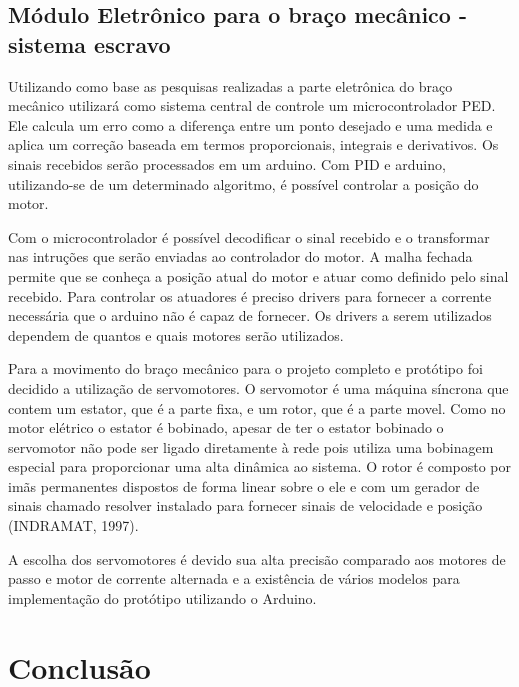\documentclass[a4paper]{article}
\begin{document}
\subsection{Módulo Eletrônico para o braço mecânico - sistema escravo}

Utilizando como base as pesquisas realizadas a parte eletrônica do braço mecânico utilizará como sistema central de controle um microcontrolador PED. Ele calcula um erro como a diferença entre um ponto desejado e uma medida e aplica um correção baseada em termos proporcionais, integrais e derivativos. Os sinais recebidos serão processados em um arduino. Com PID e arduino, utilizando-se de um determinado algoritmo, é possível controlar a posição do motor.

Com o microcontrolador é possível decodificar o sinal recebido e o transformar nas intruções que serão enviadas ao controlador do motor. A malha fechada permite que se conheça a posição atual do motor e atuar como definido pelo sinal recebido.
Para controlar os atuadores é preciso drivers para fornecer a corrente necessária que o arduino não é capaz de fornecer. Os drivers a serem utilizados dependem de quantos e quais motores serão utilizados.

Para a movimento do braço mecânico para o projeto completo e protótipo foi decidido a utilização de servomotores. O servomotor é uma máquina síncrona que contem um estator, que é a parte fixa, e um rotor, que é a parte movel. Como no motor elétrico o estator é bobinado, apesar de ter o estator bobinado o servomotor não pode ser ligado diretamente à rede pois utiliza uma bobinagem especial para proporcionar uma alta dinâmica ao sistema. O rotor é composto por imãs permanentes dispostos de forma linear sobre o ele e com um gerador de sinais chamado resolver instalado para fornecer sinais de velocidade e posição (INDRAMAT, 1997). 

A escolha dos servomotores é devido sua alta precisão comparado aos motores de passo e motor de corrente alternada e a existência de vários modelos para implementação do protótipo utilizando o Arduino.


\section{Conclusão}
\end{document}
